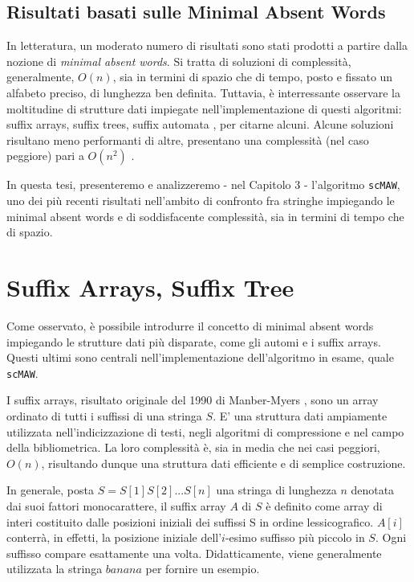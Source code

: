 \subsection{Risultati basati sulle Minimal Absent Words}

In letteratura, un moderato numero di risultati sono stati prodotti a partire dalla nozione di \textit{minimal absent words}. Si tratta di soluzioni di complessità, generalmente, $O(n)$, sia in termini di spazio che di tempo, posto e fissato un alfabeto preciso, di lunghezza ben definita. Tuttavia, è interressante osservare la moltitudine di strutture dati impiegate nell'implementazione di questi algoritmi: suffix arrays, suffix trees, suffix automata \cite{CROCHEMORE1998111}, per citarne alcuni. Alcune soluzioni risultano meno performanti di altre, presentano una complessità (nel caso peggiore) pari a $O(n^2 )$ \cite{findingMaw}.

\vspace{3mm}

In questa tesi, presenteremo e analizzeremo - nel Capitolo 3 - l'algoritmo \verb|scMAW|, uno dei più recenti risultati nell'ambito di confronto fra stringhe impiegando le minimal absent words e di soddisfacente complessità, sia in termini di tempo che di spazio.

\section{Suffix Arrays, Suffix Tree}

Come osservato, è possibile introdurre il concetto di minimal absent words impiegando le strutture dati più disparate, come gli automi e i suffix arrays. Questi ultimi sono centrali nell'implementazione dell'algoritmo in esame, quale \verb|scMAW|.

\vspace{3mm}

I suffix arrays, risultato originale del 1990 di Manber-Myers \cite{suffixArray}, sono un array ordinato di tutti i suffissi di una stringa $S$. E' una struttura dati ampiamente utilizzata nell'indicizzazione di testi, negli algoritmi di compressione e nel campo della bibliometrica. La loro complessità è, sia in media che nei casi peggiori, $O(n)$, risultando dunque una struttura dati efficiente e di semplice costruzione.

\vspace{3mm}

In generale, posta $S=S[1]S[2]...S[n]$ una stringa di lunghezza $n$ denotata dai suoi fattori monocarattere, il suffix array $A$ di $S$ è definito come array di interi costituito dalle posizioni iniziali dei suffissi S in ordine lessicografico. $A[i]$ conterrà, in effetti, la posizione iniziale dell'$i$-esimo suffisso più piccolo in $S$. Ogni suffisso compare esattamente una volta. Didatticamente, viene generalmente utilizzata la stringa $banana$ per fornire un esempio.


